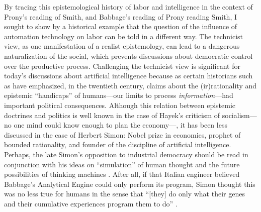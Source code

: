 \documentclass[version=last,draft=false,paper=A4,portrait,twoside=true,twocolumn=false,headinclude=false,footinclude=false,mpinclude=true,fontsize=12,BCOR=20mm,DIV=calc,pagesize=auto,open=right,chapterprefix=true,numbers=autoendperiod,headsepline=false,headings=twolinechapter,parskip=false]{scrbook}
\begin{document}
By tracing this epistemological history of labor and intelligence in the
context of Prony's reading of Smith, and Babbage's reading of Prony reading
Smith, I sought to show by a historical example that the question of the
influence of automation technology on labor can be told in a different way.
The technicist view, as one manifestation of a realist epistemology, can
lead to a dangerous naturalization of the social, which prevents
discussions about democratic control over the productive process.
Challenging the technicist view is significant for today's discussions
about artificial intelligence because as certain historians such as
\textcite{heyck2012} have emphasized, in the twentieth century, claims about
the (ir)rationality and epistemic ``handicaps'' of humans---our limits to
process \emph{information}---had important political consequences. Although this
relation between epistemic doctrines and politics is well known in the case
of Hayek's criticism of socialism---no one mind could know enough to plan
the economy---, it has been less discussed in the case of Herbert Simon:
Nobel prize in economics, prophet of bounded rationality, and founder of
the discipline of artificial intelligence. Perhaps, the late Simon's
opposition to industrial democracy should be read in conjunction with his
ideas on ``simulation'' of human thought and the future possibilities of
thinking machines \autocite{simon1983b}. After all, if that Italian engineer
believed Babbage's Analytical Engine could only perform its program, Simon
thought this was no less true for humans in the sense that ``[they] do only
what their genes and their cumulative experiences program them to do''
\autocite[45]{simon1960_1985}.









\printbibliography[title=References]
\end{document}
